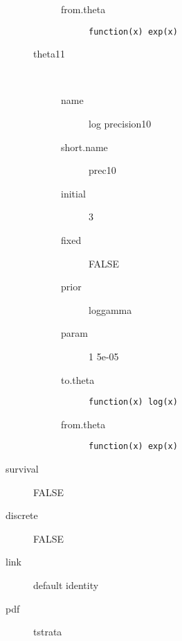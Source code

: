 \begin{description}
\begin{description}
\begin{description}
	 	 	 \item[ from.theta ] \verb|function(x) exp(x) | 
	 	 \end{description}
	 	\item[theta11]\ 
	 	 \begin{description}
	 	 	 \item[ name ] log precision10 
	 	 	 \item[ short.name ] prec10 
	 	 	 \item[ initial ] 3 
	 	 	 \item[ fixed ] FALSE 
	 	 	 \item[ prior ] loggamma 
	 	 	 \item[ param ] 1 5e-05 
	 	 	 \item[ to.theta ] \verb|function(x) log(x)| 
	 	 	 \item[ from.theta ] \verb|function(x) exp(x) | 
	 	 \end{description}
	 \end{description}
	 \item[ survival ] FALSE 
	 \item[ discrete ] FALSE 
	 \item[ link ] default identity 
	 \item[ pdf ] tstrata 
\end{description}
